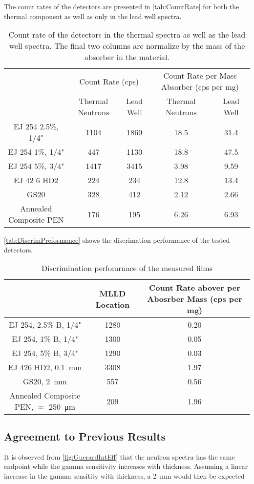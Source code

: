 \documentclass[draftcls,onecolumn]{IEEEtran}
\begin{document}
The count rates of the detectors are presented in \autoref{tab:CountRate} for both the thermal component as well as only in the lead well spectra.
\begin{table}
\caption[Detector Count Rate]{Count rate of the detectors in the thermal spectra as well as the lead well spectra.  The final two columns are normalize by the mass of the absorber in the material.}
\label{tab:CountRate}
\begin{tabular}{c | c c| c c}
&\multicolumn{2}{|c|}{Count Rate (cps)}&\multicolumn{2}{|c|}{Count Rate per Mass Absorber (cps per mg)} \\
& Thermal Neutrons &Lead Well & Thermal Neutrons & Lead Well\\
\hline
\hline
EJ 254 2.5\%, 1/4"&	1104	&	1869	&	18.5	&	31.4	\\
EJ 254 1\%, 1/4"&	447	&	1130	&	18.8	&	47.5	\\
EJ 254 5\%, 3/4"&	1417	&	3415	&	3.98	&	9.59	\\
EJ 42 6 HD2&	224	&	234	&	12.8	&	13.4	\\
GS20&	328	&	412	&	2.12	&	2.66	\\
Annealed Composite PEN&	176	&	195	&	6.26	&	6.93	\\

\end{tabular}
\end{table}

\autoref{tab:DiscrimPreformance} shows the discrimation performance of the tested detectors.

\begin{table}
\caption[Discrimination Performance]{Discrimination perfomrnace of the measured films}
\label{tab:DiscrimPreformance}
\begin{tabular}{c | c c}
	&	MLLD Location	&	Count Rate abover per Abosrber Mass (cps per mg)	\\
\hline
\hline
EJ 254, 2.5\% B, 1/4"	&	1280	&	0.20	\\
EJ 254, 1\% B, 1/4"	&	1300	&	0.05	\\
EJ 254, 5\% B, 3/4"	&	1290		&	0.03	\\
EJ 426 HD2, \SI{0.1}{\mm}&	3308		&	1.97	\\
GS20, \SI{2}{\mm}	&	557		&	0.56	\\
Annealed Composite PEN, $\approx$ \SI{250}{\um}	&	209	&	1.96	\\
\end{tabular}
\end{table}


\subsection{Agreement to Previous Results}
It is observed from \autoref{fig:GuerardIntEff} that the neutron spectra has the same endpoint while the gamma sensitivity increases with thickness.
Assuming a linear increase in the gamma sensitity with thickness, a \SI{2}{\mm} would then be expected 
\end{document}
